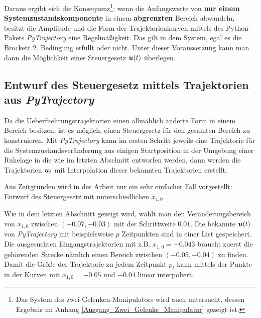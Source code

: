 Daraus ergibt sich die Konsequenz\footnote{Das System des zwei-Gelenken-Manipulators wird auch untersucht, dessen Ergebnis im Anhang \ref{Ausgang_Zwei_Gelenke_Manipulator} gezeigt ist.}: wenn die Anfangswerte von \textbf{nur einem Systemzustandskomponente} in einem \textbf{abgrenzten} Bereich abwandeln, besitzt die Amplitude und die Form der Trajektorienkurven mittels des Python-Pakets \emph{PyTrajectory} eine Regelmäßigkeit. Das gilt in dem System, egal es die Brockett $2.$ Bedingung erfüllt oder nicht. Unter dieser Voraussetzung kann man dann die Möglichkeit eines Steuergesetz $\boldsymbol u(t)$ überlegen.

\subsection{Entwurf des Steuergesetz mittels Trajektorien aus \emph{PyTrajectory}}
\label{Entwurf_des_Steuergesetz_mittels_Trajektorien_aus_PyTrajectory}
Da die Ueberfuehrungstrajektorien einen allmählich änderte Form in einem Bereich besitzen, ist es möglich, einen Steuergesetz für den gesamten Bereich zu konstruieren. Mit \emph{PyTrajectory} kann im ersten Schritt jeweils eine Trajektorie für die Systemzustandsveränderung aus einigen Startposition in der Umgebung einer Ruhelage in die wie im letzten Abschnitt entworfen werden, dann werden die Trajektorien $\boldsymbol u_{t}$ mit Interpolation dieser bekannten Trajektorien erstellt.  

Aus Zeitgründen wird in der Arbeit nur ein sehr einfacher Fall vorgestellt: Entwurf des Steuergesetz mit unterschiedlichen $x_{1,0}$.

Wie in dem letzten Abschnitt gezeigt wird, wählt man den Veränderungsbereich von $x_{1,0}$ zwischen $(-0.07,-0.03)$ mit der Schrittweite $0.01$. Die bekannte $\boldsymbol u(t)$ von \emph{PyTrajectory} mit beispielsweise $p$ Zeitpunkten sind in einer List gespeichert. Die ausgesuchten Eingangstrajektorien mit z.B. $x_{1,0}=-0.043$ braucht zuerst die gehörenden Strecke nämlich einen Bereich zwischen $(-0.05,-0.04)$ zu finden. Damit die Größe der Trajektorie zu jedem Zeitpunkt $p_{i}$ kann mittels der Punkte in der Kurven mit $x_{1,0}=-0.05$ und $-0.04$ linear interpoliert.

